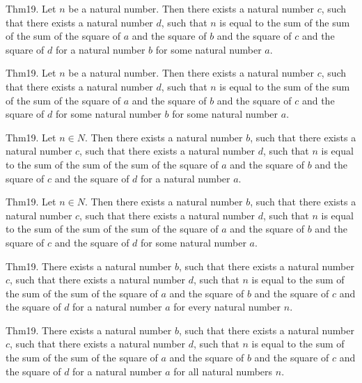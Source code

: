 \documentclass{article}
\begin{document}
Thm19. Let $n$ be a natural number. Then there exists a natural number $c$, such that there exists a natural number $d$, such that $n$ is equal to the sum of the sum of the sum of the square of $a$ and the square of $b$ and the square of $c$ and the square of $d$ for a natural number $b$ for some natural number $a$.

Thm19. Let $n$ be a natural number. Then there exists a natural number $c$, such that there exists a natural number $d$, such that $n$ is equal to the sum of the sum of the sum of the square of $a$ and the square of $b$ and the square of $c$ and the square of $d$ for some natural number $b$ for some natural number $a$.

Thm19. Let $n \in N$. Then there exists a natural number $b$, such that there exists a natural number $c$, such that there exists a natural number $d$, such that $n$ is equal to the sum of the sum of the sum of the square of $a$ and the square of $b$ and the square of $c$ and the square of $d$ for a natural number $a$.

Thm19. Let $n \in N$. Then there exists a natural number $b$, such that there exists a natural number $c$, such that there exists a natural number $d$, such that $n$ is equal to the sum of the sum of the sum of the square of $a$ and the square of $b$ and the square of $c$ and the square of $d$ for some natural number $a$.

Thm19. There exists a natural number $b$, such that there exists a natural number $c$, such that there exists a natural number $d$, such that $n$ is equal to the sum of the sum of the sum of the square of $a$ and the square of $b$ and the square of $c$ and the square of $d$ for a natural number $a$ for every natural number $n$.

Thm19. There exists a natural number $b$, such that there exists a natural number $c$, such that there exists a natural number $d$, such that $n$ is equal to the sum of the sum of the sum of the square of $a$ and the square of $b$ and the square of $c$ and the square of $d$ for a natural number $a$ for all natural numbers $n$.
\end{document}
